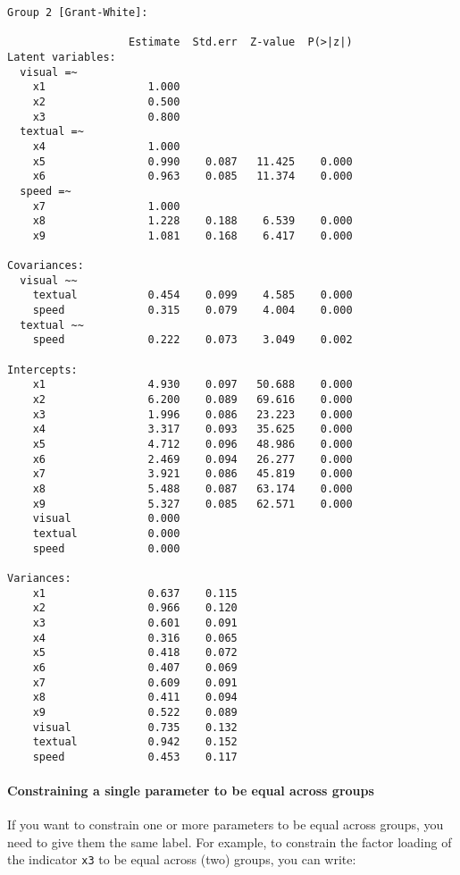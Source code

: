 \begin{verbatim}
Group 2 [Grant-White]:

                   Estimate  Std.err  Z-value  P(>|z|)
Latent variables:
  visual =~
    x1                1.000
    x2                0.500
    x3                0.800
  textual =~
    x4                1.000
    x5                0.990    0.087   11.425    0.000
    x6                0.963    0.085   11.374    0.000
  speed =~
    x7                1.000
    x8                1.228    0.188    6.539    0.000
    x9                1.081    0.168    6.417    0.000

Covariances:
  visual ~~
    textual           0.454    0.099    4.585    0.000
    speed             0.315    0.079    4.004    0.000
  textual ~~
    speed             0.222    0.073    3.049    0.002

Intercepts:
    x1                4.930    0.097   50.688    0.000
    x2                6.200    0.089   69.616    0.000
    x3                1.996    0.086   23.223    0.000
    x4                3.317    0.093   35.625    0.000
    x5                4.712    0.096   48.986    0.000
    x6                2.469    0.094   26.277    0.000
    x7                3.921    0.086   45.819    0.000
    x8                5.488    0.087   63.174    0.000
    x9                5.327    0.085   62.571    0.000
    visual            0.000
    textual           0.000
    speed             0.000

Variances:
    x1                0.637    0.115
    x2                0.966    0.120
    x3                0.601    0.091
    x4                0.316    0.065
    x5                0.418    0.072
    x6                0.407    0.069
    x7                0.609    0.091
    x8                0.411    0.094
    x9                0.522    0.089
    visual            0.735    0.132
    textual           0.942    0.152
    speed             0.453    0.117
\end{verbatim}

\paragraph{Constraining a single parameter to be equal across groups}

If you want to constrain one or more parameters to be equal across
groups, you need to give them the same label. For example, to constrain
the factor loading of the indicator \texttt{x3} to be equal across (two)
groups, you can write:

\begin{Shaded}
\begin{Highlighting}[]
\end{Highlighting}
\end{Shaded}

